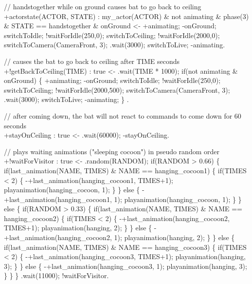 \documentclass[draft,final]{vutinfth} %
\begin{document}
{// handstogether while on ground causes bat to go back to ceiling\\
+actorstate(ACTOR, STATE) : my\_actor(ACTOR) \& not animating \& phase(3) \& STATE == handstogether \& onGround
    <-  +animating;
        -onGround;
        switchToIdle;
        !waitForIdle(250,0);
        switchToCeiling;
        !waitForIdle(2000,0);
        switchToCamera(CameraFront, 3);
        .wait(3000);
        switchToLive;
        -animating.

// causes the bat to go back to ceiling after TIME seconds\\
+!getBackToCeiling(TIME) : true
    <-  .wait(TIME * 1000);
        if(not animating \& onGround)
        \{
            +animating;
            -onGround;
            switchToIdle;
            !waitForIdle(250,0);
            switchToCeiling;
            !waitForIdle(2000,500);
            switchToCamera(CameraFront, 3);
            .wait(3000);
            switchToLive;
            -animating;
        \} .

// after coming down, the bat will not react to commands to come down for 60 seconds\\
+stayOnCeiling : true
    <-  .wait(60000);
        -stayOnCeiling.

// plays waiting animations ("sleeping cocoon") in pseudo random order\\
+!waitForVisitor : true
        <-  .random(RANDOM);
            if(RANDOM > 0.66)
            \{
                if(last\_animation(NAME, TIMES) \& NAME == hanging\_cocoon1)
                \{
                    if(TIMES < 2)
                    \{
                        -+last\_animation(hanging\_cocoon1, TIMES+1);
                        playanimation(hanging\_cocoon, 1);
                    \}
                \}
                else
                \{
                    -+last\_animation(hanging\_cocoon1, 1);
                    playanimation(hanging\_cocoon, 1);
                \}
            \}
            else
            \{
            if(RANDOM > 0.33)
            \{
                if(last\_animation(NAME, TIMES) \& NAME == hanging\_cocoon2)
                \{
                    if(TIMES < 2)
                    \{
                        -+last\_animation(hanging\_cocoon2, TIMES+1);
                        playanimation(hanging, 2);
                    \}
                \}
                else
                \{
                    -+last\_animation(hanging\_cocoon2, 1);
                    playanimation(hanging, 2);
                \}
            \}
            else
            \{
                if(last\_animation(NAME, TIMES) \& NAME == hanging\_cocoon3)
                \{
                    if(TIMES < 2)
                    \{
                        -+last\_animation(hanging\_cocoon3, TIMES+1);
                        playanimation(hanging, 3);
                    \}
                \}
                else
                \{
                    -+last\_animation(hanging\_cocoon3, 1);
                    playanimation(hanging, 3);
                \}
            \}
            \}
            .wait(11000);      
            !waitForVisitor.
            
}
\end{document}
